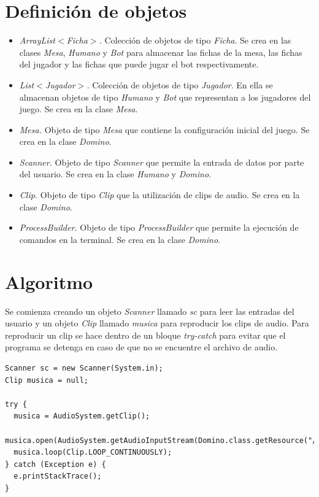 \documentclass[12pt]{article}
\begin{document}
  \section{Definición de objetos}
  \begin{itemize}
    \item \textit{ArrayList$<$Ficha$>$.} Colección de objetos de tipo \textit{Ficha}. Se crea en las clases \textit{Mesa}, \textit{Humano} y \textit{Bot} para almacenar las fichas de la mesa, las fichas del jugador y las fichas que puede jugar el bot respectivamente.
    \item \textit{List$<$Jugador$>$.} Colección de objetos de tipo \textit{Jugador}. En ella se almacenan objetos de tipo \textit{Humano} y \textit{Bot} que representan a los jugadores del juego. Se crea en la clase \textit{Mesa}.
    \item \textit{Mesa.} Objeto de tipo \textit{Mesa} que contiene la configuración inicial del juego. Se crea en la clase \textit{Domino}.
    \item \textit{Scanner.} Objeto de tipo \textit{Scanner} que permite la entrada de datos por parte del usuario. Se crea en la clase \textit{Humano} y \textit{Domino}.
    \item \textit{Clip.} Objeto de tipo \textit{Clip} que la utilización de clips de audio. Se crea en la clase \textit{Domino}.
    \item \textit{ProcessBuilder.} Objeto de tipo \textit{ProcessBuilder} que permite la ejecución de comandos en la terminal. Se crea en la clase \textit{Domino}.
  \end{itemize}

  \section{Algoritmo}
  Se comienza creando un objeto \textit{Scanner} llamado \textit{sc} para leer las entradas del usuario y un objeto \textit{Clip} llamado \textit{musica} para reproducir los clips de audio. Para reproducir un clip se hace dentro de un bloque \textit{try-catch} para evitar que el programa se detenga en caso de que no se encuentre el archivo de audio.

  \begin{lstlisting}
Scanner sc = new Scanner(System.in);
Clip musica = null;

try {
  musica = AudioSystem.getClip();
  musica.open(AudioSystem.getAudioInputStream(Domino.class.getResource("/recursos/MoonlightSonata.wav")));
  musica.loop(Clip.LOOP_CONTINUOUSLY); 
} catch (Exception e) {
  e.printStackTrace();
}
  \end{lstlisting}
\end{document}
